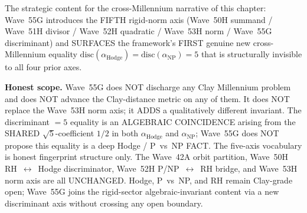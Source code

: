 \begin{remark}
\begin{itemize}
\end{itemize}
The strategic content for the cross-Millennium narrative of this chapter: Wave~55G introduces the FIFTH rigid-norm axis (Wave~50H summand / Wave~51H divisor / Wave~52H quadratic / Wave~53H norm / Wave~55G discriminant) and SURFACES the framework's FIRST genuine new cross-Millennium equality $\mathrm{disc}(\alpha_{\mathrm{Hodge}}) = \mathrm{disc}(\alpha_{\mathrm{NP}}) = 5$ that is structurally invisible to all four prior axes.

\textbf{Honest scope.} Wave~55G does NOT discharge any Clay Millennium problem and does NOT advance the Clay-distance metric on any of them. It does NOT replace the Wave~53H norm axis; it ADDS a qualitatively different invariant. The discriminant $= 5$ equality is an ALGEBRAIC COINCIDENCE arising from the SHARED $\sqrt{5}$-coefficient $1/2$ in both $\alpha_{\mathrm{Hodge}}$ and $\alpha_{\mathrm{NP}}$; Wave~55G does NOT propose this equality is a deep Hodge / P~vs~NP FACT. The five-axis vocabulary is honest fingerprint structure only. The Wave~42A orbit partition, Wave~50H RH~$\leftrightarrow$~Hodge discriminator, Wave~52H P/NP~$\leftrightarrow$~RH bridge, and Wave~53H norm axis are all UNCHANGED. Hodge, P~vs~NP, and RH remain Clay-grade open; Wave~55G joins the rigid-sector algebraic-invariant content via a new discriminant axis without crossing any open boundary.
\end{remark}

